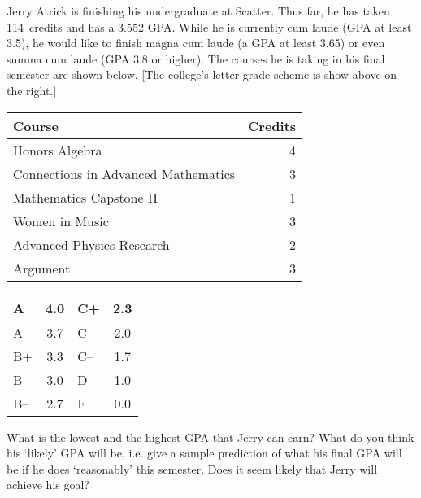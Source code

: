 \documentclass[11pt,letterpaper]{article}
\begin{document}
 Jerry Atrick is finishing his undergraduate at Scatter. Thus far, he has taken 114~credits and has a 3.552 GPA. While he is currently cum laude (GPA at least 3.5), he would like to finish magna cum laude (a GPA at least 3.65) or even summa cum laude (GPA 3.8 or higher). The courses he is taking in his final semester are shown below.  [The college's letter grade scheme is show above on the right.] \par
	\begin{table}[!ht]
	\centering
	\begin{tabular}{lr}
	Course & Credits \\ \hline
	Honors Algebra & 4 \\
	Connections in Advanced Mathematics & 3 \\
	Mathematics Capstone II & 1 \\
	Women in Music & 3 \\
	Advanced Physics Research & 2 \\
	Argument & 3
	\end{tabular} \hspace{1cm}
        \begin{tabular}{|l||c|l||c|} \hline
        A & 4.0 & C+ & 2.3 \\ \hline
        A-- & 3.7 & C & 2.0 \\ \hline
        B+ & 3.3 & C-- & 1.7 \\ \hline
        B & 3.0 & D & 1.0 \\ \hline
        B-- & 2.7 & F & 0.0 \\ \hline
        \end{tabular}
	\end{table} \par
What is the lowest and the highest GPA that Jerry can earn? What do you think his `likely' GPA will be, i.e. give a sample prediction of what his final GPA will be if he does `reasonably' this semester. Does it seem likely that Jerry will achieve his goal? \pspace
\end{document}
